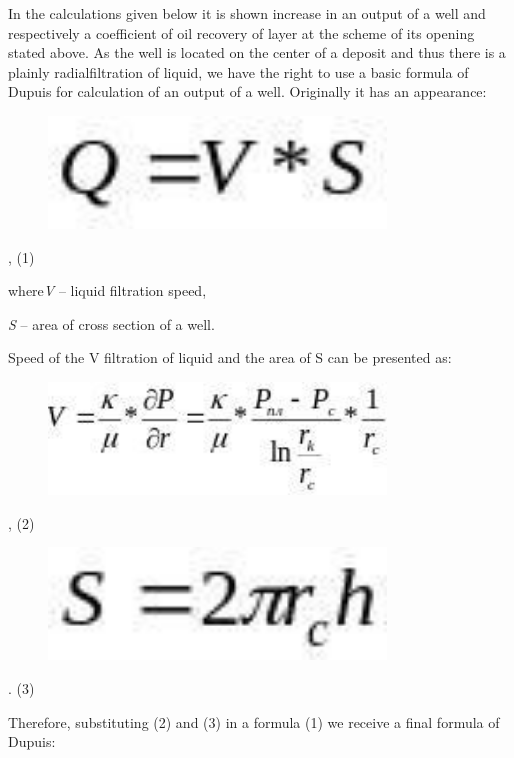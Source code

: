 In the calculations given below it is shown increase in an output of a
well and respectively a coefficient of oil recovery of layer at the
scheme of its opening stated above. As the well is located on the center
of a deposit and thus there is a plainly radialfiltration of liquid, we
have the right to use a basic formula of Dupuis for calculation of an
output of a well. Originally it has an appearance:

\begin{figure}[H]
	\centering
	\includegraphics[width=0.8\textwidth]{assets/1342}
	\caption*{}
\end{figure}, (1)

where\emph{V} -- liquid filtration speed,

\emph{S} -- area of cross section of a well.

Speed of the V filtration of liquid and the area of S can be presented
as:

\begin{figure}[H]
	\centering
	\includegraphics[width=0.8\textwidth]{assets/1343}
	\caption*{}
\end{figure}, (2)

\begin{figure}[H]
	\centering
	\includegraphics[width=0.8\textwidth]{assets/1344}
	\caption*{}
\end{figure}. (3)

Therefore, substituting (2) and (3) in a formula (1) we receive a final
formula of Dupuis:

